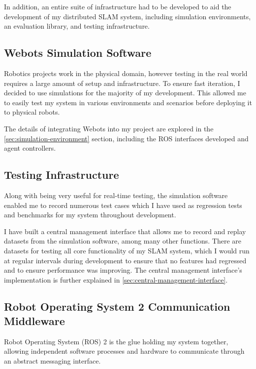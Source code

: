 In addition, an entire suite of infrastructure had to be developed to aid the development of my distributed SLAM system, including simulation environments, an evaluation library, and testing infrastructure.

\subsection{Webots Simulation Software}
\label{sec:webots-simulator}

Robotics projects work in the physical domain, however testing in the real world requires a large amount of setup and infrastructure. To ensure fast iteration, I decided to use simulations for the majority of my development. This allowed me to easily test my system in various environments and scenarios before deploying it to physical robots.

The details of integrating Webots into my project are explored in the \autoref{sec:simulation-environment} section, including the ROS interfaces developed and agent controllers.

\subsection{Testing Infrastructure}
\label{sec:testing-infrastructure}

Along with being very useful for real-time testing, the simulation software enabled me to record numerous test cases which I have used as regression tests and benchmarks for my system throughout development.

I have built a central management interface that allows me to record and replay datasets from the simulation software, among many other functions. There are datasets for testing all core functionality of my SLAM system, which I would run at regular intervals during development to ensure that no features had regressed and to ensure performance was improving. The central management interface's implementation is further explained in \autoref{sec:central-management-interface}.

\subsection{Robot Operating System 2 Communication Middleware}
\label{sec:ros-2}
Robot Operating System (ROS) 2 is the glue holding my system together, allowing independent software processes and hardware to communicate through an abstract messaging interface.

